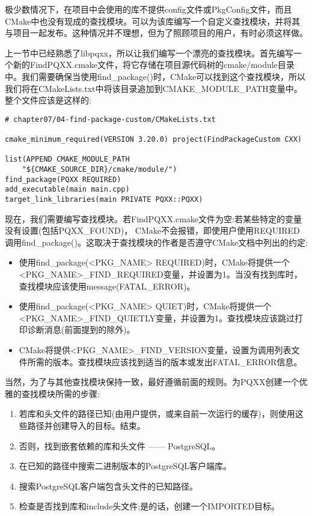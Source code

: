 极少数情况下，在项目中会使用的库不提供config文件或PkgConfig文件，而且CMake中也没有现成的查找模块。可以为该库编写一个自定义查找模块，并将其与项目一起发布。这种情况并不理想，但为了照顾项目的用户，有时必须这样做。

上一节中已经熟悉了libpqxx，所以让我们编写一个漂亮的查找模块。首先编写一个新的FindPQXX.cmake文件，将它存储在项目源代码树的cmake/module目录中。我们需要确保当使用find\_package()时，CMake可以找到这个查找模块，所以我们将在CMakeLists.txt中将该目录追加到CMAKE\_MODULE\_PATH变量中。整个文件应该是这样的:

\begin{lstlisting}[style=styleCMake]
# chapter07/04-find-package-custom/CMakeLists.txt

cmake_minimum_required(VERSION 3.20.0) project(FindPackageCustom CXX) 

list(APPEND CMAKE_MODULE_PATH 
	"${CMAKE_SOURCE_DIR}/cmake/module/")
find_package(PQXX REQUIRED)
add_executable(main main.cpp)
target_link_libraries(main PRIVATE PQXX::PQXX)
\end{lstlisting}

现在，我们需要编写查找模块。若FindPQXX.cmake文件为空:若某些特定的变量没有设置(包括PQXX\_FOUND)， CMake不会报错，即使用户使用REQUIRED调用find\_package()。这取决于查找模块的作者是否遵守CMake文档中列出的约定:

\begin{itemize}
\item 
使用find\_package(<PKG\_NAME> REQUIRED)时，CMake将提供一个<PKG\_NAME>\_FIND\_REQUIRED变量，并设置为1。当没有找到库时，查找模块应该使用message(FATAL\_ERROR)。

\item 
使用find\_package(<PKG\_NAME> QUIET)时，CMake将提供一个<PKG\_NAME>\_FIND\_QUIETLY变量，并设置为1。查找模块应该跳过打印诊断消息(前面提到的除外)。

\item 
CMake将提供<PKG\_NAME>\_FIND\_VERSION变量，设置为调用列表文件所需的版本。查找模块应该找到适当的版本或发出FATAL\_ERROR信息。
\end{itemize}

当然，为了与其他查找模块保持一致，最好遵循前面的规则。为PQXX创建一个优雅的查找模块所需的步骤:

\begin{enumerate}
\item 
若库和头文件的路径已知(由用户提供，或来自前一次运行的缓存)，则使用这些路径并创建导入的目标。结束。

\item 
否则，找到嵌套依赖的库和头文件 —— PostgreSQL。

\item 
在已知的路径中搜索二进制版本的PostgreSQL客户端库。

\item 
搜索PostgreSQL客户端包含头文件的已知路径。

\item 
检查是否找到库和include头文件;是的话，创建一个IMPORTED目标。
\end{enumerate}

